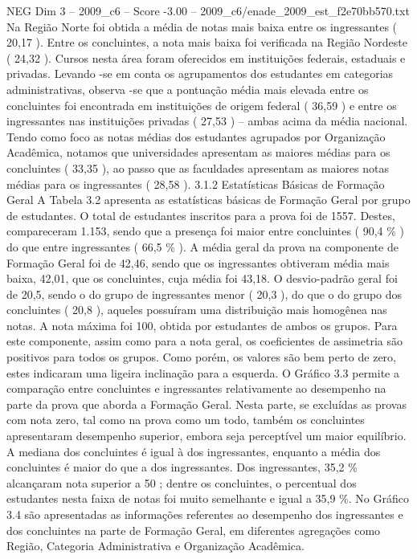 \begin{textsample}{NEG Dim 3 – 2009\_c6 – Score -3.00 – 2009\_c6/enade\_2009\_est\_f2e70bb570.txt}
Na Região Norte foi obtida a média de notas mais baixa entre os ingressantes ( 20,17 ).
Entre os concluintes, a nota mais baixa foi verificada na Região Nordeste ( 24,32 ).
Cursos nesta área foram oferecidos em instituições federais, estaduais e privadas.
Levando -se em conta os agrupamentos dos estudantes em categorias administrativas, observa -se que a pontuação média mais elevada entre os concluintes foi encontrada em instituições de origem federal ( 36,59 ) e entre os ingressantes nas instituições privadas ( 27,53 ) – ambas acima da média nacional.
Tendo como foco as notas médias dos estudantes agrupados por Organização Acadêmica, notamos que universidades apresentam as maiores médias para os concluintes ( 33,35 ), ao passo que as faculdades apresentam as maiores notas médias para os ingressantes ( 28,58 ). 3.1.2 Estatísticas Básicas de Formação Geral A Tabela 3.2 apresenta as estatísticas básicas de Formação Geral por grupo de estudantes.
O total de estudantes inscritos para a prova foi de 1557.
Destes, compareceram 1.153, sendo que a presença foi maior entre concluintes ( 90,4 \% ) do que entre ingressantes ( 66,5 \% ).
A média geral da prova na componente de Formação Geral foi de 42,46, sendo que os ingressantes obtiveram média mais baixa, 42,01, que os concluintes, cuja média foi 43,18.
O desvio-padrão geral foi de 20,5, sendo o do grupo de ingressantes menor ( 20,3 ), do que o do grupo dos concluintes ( 20,8 ), aqueles possuíram uma distribuição mais homogênea nas notas.
A nota máxima foi 100, obtida por estudantes de ambos os grupos.
Para este componente, assim como para a nota geral, os coeficientes de assimetria são positivos para todos os grupos.
Como porém, os valores são bem perto de zero, estes indicaram uma ligeira inclinação para a esquerda.
O Gráfico 3.3 permite a comparação entre concluintes e ingressantes relativamente ao desempenho na parte da prova que aborda a Formação Geral.
Nesta parte, se excluídas as provas com nota zero, tal como na prova como um todo, também os concluintes apresentaram desempenho superior, embora seja perceptível um maior equilíbrio.
A mediana dos concluintes é igual à dos ingressantes, enquanto a média dos concluintes é maior do que a dos ingressantes.
Dos ingressantes, 35,2 \% alcançaram nota superior a 50 ; dentre os concluintes, o percentual dos estudantes nesta faixa de notas foi muito semelhante e igual a 35,9 \%.
No Gráfico 3.4 são apresentadas as informações referentes ao desempenho dos ingressantes e dos concluintes na parte de Formação Geral, em diferentes agregações como Região, Categoria Administrativa e Organização Acadêmica.

\end{textsample}
